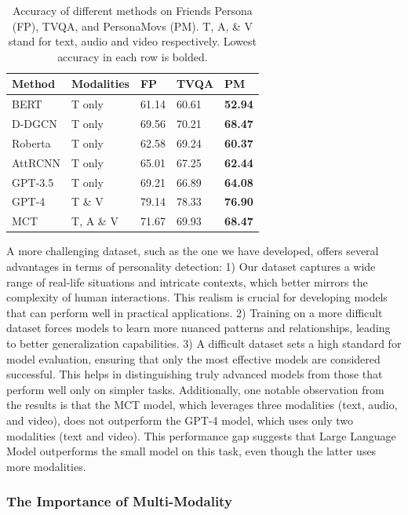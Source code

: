 \begin{table}[ht]
    \centering
    \small
    \begin{tabular}{lllll}
        \hline
        \textbf{Method} & \textbf{Modalities} & \textbf{FP} & \textbf{TVQA} & \textbf{PM} \\
        \hline
        BERT & T only& 61.14 & 60.61 & \textbf{52.94} \\
        \hline
        D-DGCN & T only & 69.56 & 70.21 & \textbf{68.47} \\
        \hline
        Roberta& T only &62.58 & 69.24 & \textbf{60.37} \\
        \hline
        AttRCNN & T only& 65.01 & 67.25 & \textbf{62.44}\\
        \hline
        GPT-3.5 & T only & 69.21 & 66.89 & \textbf{64.08}\\
        \hline
        GPT-4 & T \& V & 79.14 & 78.33 & \textbf{76.90}\\
        \hline
        MCT & T, A \& V & 71.67 & 69.93 & \textbf{68.47} \\
        \hline
    \end{tabular}
    \caption{Accuracy of different methods on Friends Persona (FP), TVQA, and PersonaMovs (PM). T, A, \& V stand for text, audio and video respectively. Lowest accuracy in each row is bolded.} 
\label{table:Method_Comparison}
\end{table}
A more challenging dataset, such as the one we have developed, offers several advantages in terms of personality detection: 1) Our dataset captures a wide range of real-life situations and intricate contexts, which better mirrors the complexity of human interactions. This realism is crucial for developing models that can perform well in practical applications. 2) Training on a more difficult dataset forces models to learn more nuanced patterns and relationships, leading to better generalization capabilities. 3) A difficult dataset sets a high standard for model evaluation, ensuring that only the most effective models are considered successful. This helps in distinguishing truly advanced models from those that perform well only on simpler tasks. Additionally, one notable observation from the results is that the MCT model, which leverages three modalities (text, audio, and video), does not outperform the GPT-4 model, which uses only two modalities (text and video). This performance gap suggests that Large Language Model outperforms the small model on this task, even though the latter uses more modalities.
\subsubsection{The Importance of Multi-Modality}



